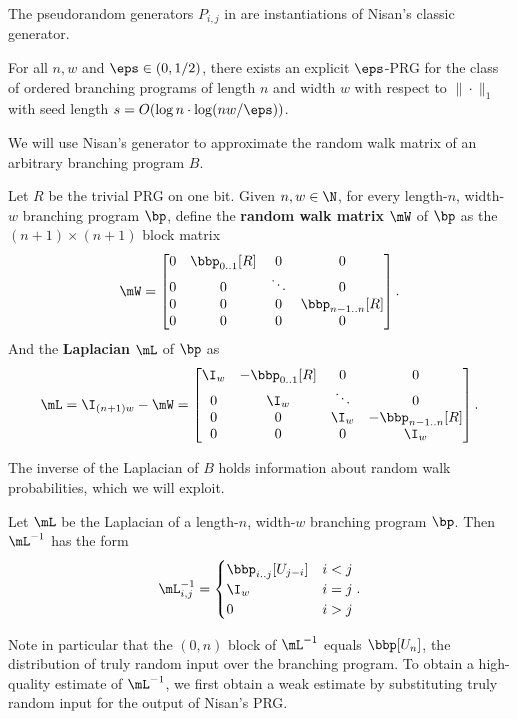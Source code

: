 The pseudorandom generators $P_{i,j}$ in  are instantiations
of Nisan's classic generator. %
\begin{theorem}\label{thm:nisan}
    For all $n,w$ and $\eps \in (0,1/2)$, there exists an explicit $\eps$-PRG for the class of ordered branching programs of length $n$ and width $w$ with respect to $\|\cdot\|_{1}$ with seed length $s=O(\log n\cdot \log(nw/\eps))$.
\end{theorem}
We will use Nisan's generator to approximate the random walk matrix of an arbitrary branching program $B$.
\begin{definition}\label{def:pathLap}
Let $R$ be the trivial PRG on one bit. Given $n,w\in \N$, for every length-$n$, width-$w$ branching program $\bp$, define the \textbf{random walk matrix} $\mW$ of $\bp$ as the $(n+1)\times (n+1)$ block matrix
\[\mW=\begin{bmatrix}
0 & \bbp_{0..1}[R] & 0 & 0\\
0 & 0 & \ddots & 0\\
0 & 0 & 0 & \bbp_{n-1..n}[R]\\
0 & 0 & 0 & 0\\
\end{bmatrix}.\]
And the \textbf{Laplacian} $\mL$ of $\bp$ as
\[\mL=\I_{(n+1)w}-\mW=\begin{bmatrix}
\I_w & -\bbp_{0..1}[R] & 0 & 0\\
0 & \I_w & \ddots & 0\\
0 & 0 & \I_w & -\bbp_{n-1..n}[R]\\
0 & 0 & 0 & \I_w\\
\end{bmatrix}.\]
\end{definition}
The inverse of the Laplacian of $B$ holds information about random walk probabilities, which we will exploit.
\begin{remark}\label{rmk:pathLinv}
Let $\mL$ be the Laplacian of a length-$n$, width-$w$ branching program $\bp$. Then $\mL^{-1}$ has the form %
\[\mL^{-1}_{i,j}=\begin{cases}
\bbp_{i..j}[U_{j-i}] & i<j\\
\I_w & i=j\\
0 & i>j
\end{cases}.\] 
\end{remark}
Note in particular that the $(0,n)$ block of $\mL^{-1}$ equals $\bbp[U_n]$, the distribution of truly random input over the branching program. To obtain a high-quality %
estimate of $\mL^{-1}$, we first obtain a weak estimate by substituting truly random input for the output of Nisan's PRG.
